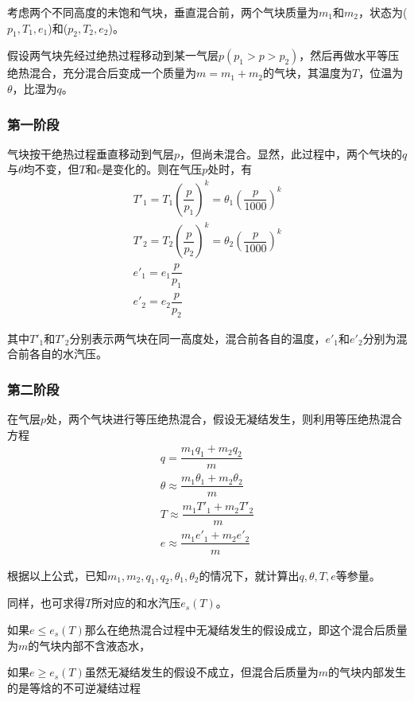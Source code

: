 \documentclass[UTF8,a4paper,11pt,oneside]{ctexbook}
\begin{document}
考虑两个不同高度的未饱和气块，垂直混合前，两个气块质量为\(m_1\)和\(m_2\)，状态为(\(p_1,T_1,e_1\))和(\(p_2,T_2,e_2\))。

假设两气块先经过绝热过程移动到某一气层\(p(p_1>p>p_2)\)，然后再做水平等压绝热混合，充分混合后变成一个质量为\(m=m_1+m_2\)的气块，其温度为\(T\)，位温为\(\theta\)，比湿为\(q\)。

\subsubsection{第一阶段}

气块按干绝热过程垂直移动到气层\(p\)，但尚未混合。显然，此过程中，两个气块的\(q\)与\(\theta\)均不变，但\(T\)和\(e\)是变化的。则在气压\(p\)处时，有
\begin{gather}
    T'_1=T_1\left(\dfrac{p}{p_1}\right)^k=\theta_1\left(\dfrac{p}{1000}\right)^k\\
    T'_2=T_2\left(\dfrac{p}{p_2}\right)^k=\theta_2\left(\dfrac{p}{1000}\right)^k\\
    e'_1=e_1\dfrac{p}{p_1}\\
    e'_2=e_2\dfrac{p}{p_2}
\end{gather}

其中\(T'_1\)和\(T'_2\)分别表示两气块在同一高度处，混合前各自的温度，\(e'_1\)和\(e'_2\)分别为混合前各自的水汽压。

\subsubsection{第二阶段}

在气层\(p\)处，两个气块进行等压绝热混合，假设无凝结发生，则利用等压绝热混合方程
\begin{gather}
    q=\dfrac{m_1q_1+m_2q_2}{m}\\
    \theta\approx\dfrac{m_1\theta_1+m_2\theta_2}{m}\\
    T\approx\dfrac{m_1T'_1+m_2T'_2}{m}\\
    e\approx\dfrac{m_1e'_1+m_2e'_2}{m}
\end{gather}

根据以上公式，已知\(m_1,m_2,q_1,q_2,\theta_1,\theta_2\)的情况下，就计算出\(q,\theta,T,e\)等参量。

同样，也可求得\(T\)所对应的和水汽压\(e_s(T)\)。

如果\(e\leq{}e_s(T)\)那么在绝热混合过程中无凝结发生的假设成立，即这个混合后质量为\(m\)的气块内部不含液态水，

如果\(e\geq{}e_s(T)\)虽然无凝结发生的假设不成立，但混合后质量为\(m\)的气块内部发生的是等焓的不可逆凝结过程
\end{document}
